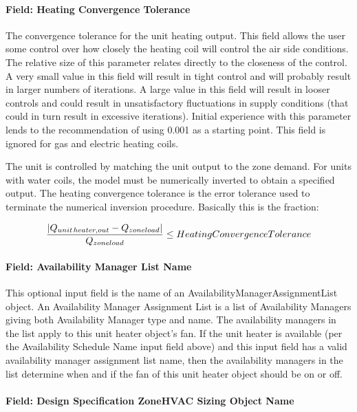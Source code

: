 \paragraph{Field: Heating Convergence Tolerance}\label{field-heating-convergence-tolerance-2}

The convergence tolerance for the unit heating output. This field allows the user some control over how closely the heating coil will control the air side conditions. The relative size of this parameter relates directly to the closeness of the control. A very small value in this field will result in tight control and will probably result in larger numbers of iterations. A large value in this field will result in looser controls and could result in unsatisfactory fluctuations in supply conditions (that could in turn result in excessive iterations). Initial experience with this parameter lends to the recommendation of using 0.001 as a starting point. This field is ignored for gas and electric heating coils.

The unit is controlled by matching the unit output to the zone demand. For units with water coils, the model must be numerically inverted to obtain a specified output. The heating convergence tolerance is the error tolerance used to terminate the numerical inversion procedure. Basically this is the fraction:

\begin{equation}
\frac{{\left| {{Q_{unit{\kern 1pt} heater,out}} - {Q_{zoneload}}} \right|}}{{{Q_{zoneload}}}} \le HeatingConvergenceTolerance
\end{equation}

\paragraph{Field: Availability Manager List Name}\label{field-availability-manager-list-name-2}

This optional input field is the name of an AvailabilityManagerAssignmentList object. An Availability Manager Assignment List is a list of Availability Managers giving both Availability Manager type and name. The availability managers in the list apply to this unit heater object's fan. If the unit heater is available (per the Availability Schedule Name input field above) and this input field has a valid availability manager assignment list name, then the availability managers in the list determine when and if the fan of this unit heater object should be on or off.

\paragraph{Field: Design Specification ZoneHVAC Sizing Object Name}\label{field-design-specification-zonehvac-sizing-object-name-3}

